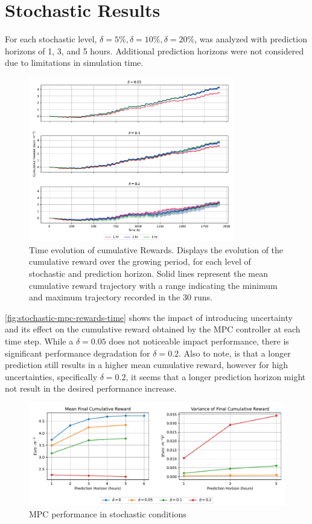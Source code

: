\section{Stochastic Results}
For each stochastic level, $\delta = 5\%, \delta = 10\%, \delta = 20\%$, was analyzed with prediction horizons of 1, 3, and 5 hours. Additional prediction horizons were not considered due to limitations in simulation time. 

\begin{figure}[H]
	\centering
	\includegraphics[width=0.8\textwidth]{figures/stochastic_mpc_rewards_time.pdf}
	\caption{Time evolution of cumulative Rewards. Displays the evolution of the cumulative reward over the growing period, for each level of stochastic and prediction horizon. Solid lines represent the mean cumulative reward trajectory with a range indicating the minimum and maximum trajectory recorded in the 30 runs.}
	\label{fig:stochastic-mpc-rewards-time}
\end{figure}

\autoref{fig:stochastic-mpc-rewards-time} shows the impact of introducing uncertainty and its effect on the cumulative reward obtained by the MPC controller at each time step. While a $\delta = 0.05$ does not noticeable impact performance, there is significant performance degradation for $\delta = 0.2$. Also to note, is that a longer prediction still results in a higher mean cumulative reward, however for high uncertainties, specifically $\delta = 0.2$, it seems that a longer prediction horizon might not result in the desired performance increase.

\begin{figure}[H]
	\centering
	\includegraphics[width=\textwidth]{figures/stochastic_mpc_perf.pdf}
	\caption{MPC performance in stochastic conditions }
	\label{fig:stochastic-mpc-perf}
\end{figure}

